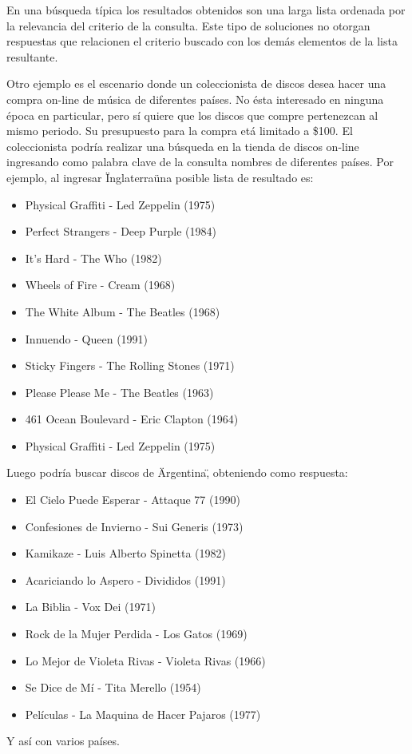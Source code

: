 En una búsqueda típica los resultados obtenidos son una larga lista ordenada por la relevancia del criterio de la consulta. Este tipo de soluciones no otorgan respuestas que relacionen el criterio buscado con los demás elementos de la lista resultante.

Otro ejemplo es el escenario donde un coleccionista de discos desea hacer una compra on-line de música de diferentes países. No ésta interesado en ninguna época en particular, pero sí quiere que los discos que compre pertenezcan al mismo periodo. Su presupuesto para la compra etá limitado a \$100. El coleccionista podría realizar una búsqueda en la tienda de discos on-line ingresando como palabra clave de la consulta nombres de diferentes países. Por ejemplo, al ingresar \"Inglaterra\" una posible lista de resultado es:
\begin{itemize}
  \item Physical Graffiti - Led Zeppelin (1975)
  \item Perfect Strangers - Deep Purple (1984)
  \item It's Hard - The Who  (1982)
  \item Wheels of Fire - Cream (1968)
  \item The White Album - The Beatles (1968)
  \item Innuendo - Queen (1991)
  \item Sticky Fingers - The Rolling Stones (1971)
	\item Please Please Me - The Beatles (1963)
	\item 461 Ocean Boulevard - Eric Clapton (1964)
	\item Physical Graffiti - Led Zeppelin (1975)
\end{itemize}

Luego podría buscar discos de \"Argentina\", obteniendo como respuesta:
\begin{itemize}
  \item El Cielo Puede Esperar - Attaque 77 (1990)
  \item Confesiones de Invierno - Sui Generis (1973)
  \item Kamikaze - Luis Alberto Spinetta (1982)
  \item Acariciando lo Aspero - Divididos (1991)
  \item La Biblia - Vox Dei (1971)
	\item Rock de la Mujer Perdida - Los Gatos (1969)
	\item Lo Mejor de Violeta Rivas - Violeta Rivas (1966)
	\item Se Dice de Mí - Tita Merello (1954)
	\item Películas - La Maquina de Hacer Pajaros (1977)
\end{itemize} 
Y así con varios países.

